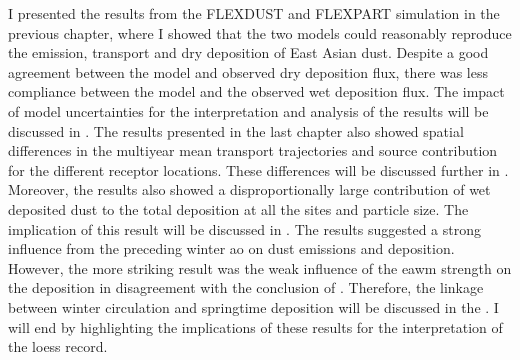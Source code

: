 
\label{chap:Discussion}
I presented the results from the FLEXDUST and FLEXPART simulation in the previous chapter, where I showed that the two models could reasonably reproduce the emission, transport and dry deposition of East Asian dust.
Despite a good agreement between the model and observed dry deposition flux, there was less compliance between the model and the observed wet deposition flux. 
The impact of model uncertainties for the interpretation and analysis of the results will be discussed in . 
The results presented in the last chapter also showed spatial differences in the multiyear mean transport trajectories and source contribution for the different receptor locations. 
These differences will be discussed further in . 
Moreover, the results also showed a disproportionally large contribution of wet deposited  dust to the total deposition at all the sites and particle size. 
The implication of this result will be discussed in . 
The results suggested a strong influence from the preceding winter \acrshort{ao} on dust emissions and deposition. 
However, the more striking result was the weak influence of the \acrshort{eawm} strength on the deposition in disagreement with the conclusion of \textcite{wyrwoll2016cold}.
Therefore, the linkage between winter circulation and springtime deposition will be discussed in the . 
I will end by highlighting the implications of these results for the interpretation of the loess record.  

